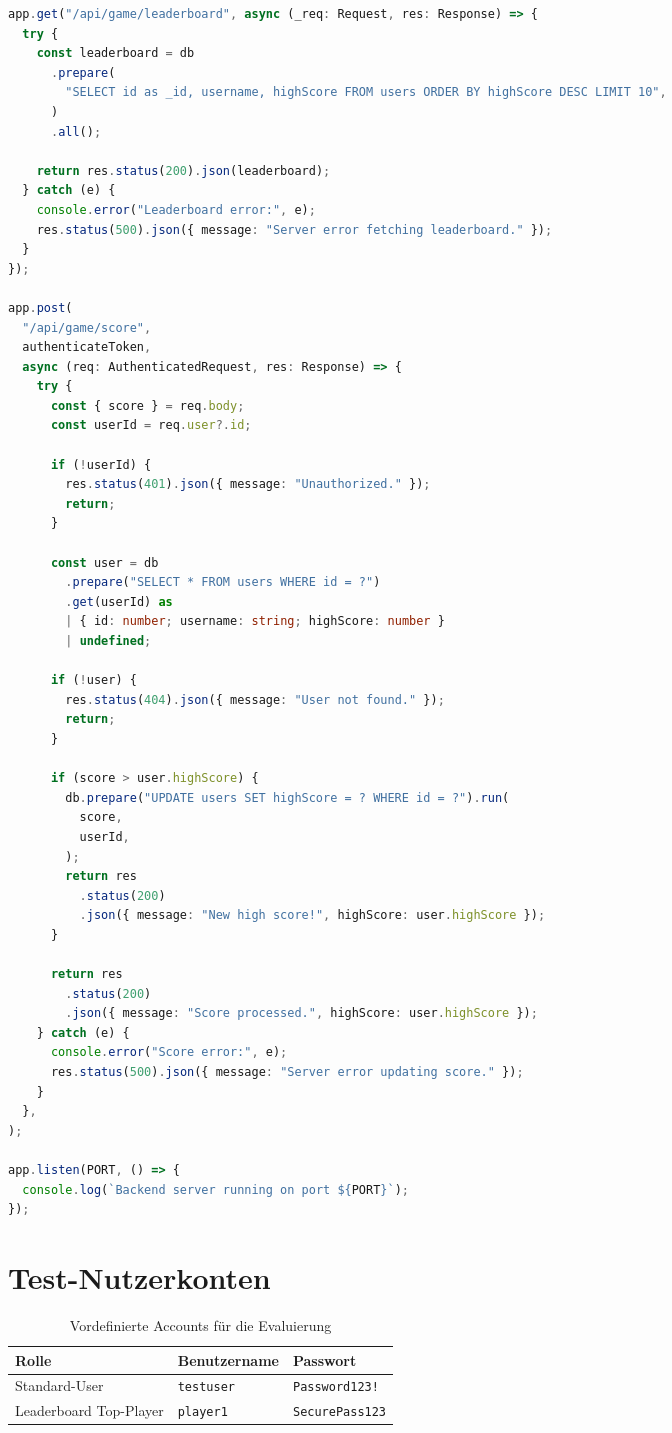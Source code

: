 \documentclass[12pt,a4paper]{article}
\begin{document}
\begin{lstlisting}[language=TypeScript, caption={Auszug aus server.ts}]
app.get("/api/game/leaderboard", async (_req: Request, res: Response) => {
  try {
    const leaderboard = db
      .prepare(
        "SELECT id as _id, username, highScore FROM users ORDER BY highScore DESC LIMIT 10",
      )
      .all();

    return res.status(200).json(leaderboard);
  } catch (e) {
    console.error("Leaderboard error:", e);
    res.status(500).json({ message: "Server error fetching leaderboard." });
  }
});

app.post(
  "/api/game/score",
  authenticateToken,
  async (req: AuthenticatedRequest, res: Response) => {
    try {
      const { score } = req.body;
      const userId = req.user?.id;

      if (!userId) {
        res.status(401).json({ message: "Unauthorized." });
        return;
      }

      const user = db
        .prepare("SELECT * FROM users WHERE id = ?")
        .get(userId) as
        | { id: number; username: string; highScore: number }
        | undefined;

      if (!user) {
        res.status(404).json({ message: "User not found." });
        return;
      }

      if (score > user.highScore) {
        db.prepare("UPDATE users SET highScore = ? WHERE id = ?").run(
          score,
          userId,
        );
        return res
          .status(200)
          .json({ message: "New high score!", highScore: user.highScore });
      }

      return res
        .status(200)
        .json({ message: "Score processed.", highScore: user.highScore });
    } catch (e) {
      console.error("Score error:", e);
      res.status(500).json({ message: "Server error updating score." });
    }
  },
);

app.listen(PORT, () => {
  console.log(`Backend server running on port ${PORT}`);
});
\end{lstlisting}

\section{Test-Nutzerkonten}
\begin{table}[htbp]
  \centering
  \caption{Vordefinierte Accounts für die Evaluierung}
  \begin{tabular}{lll}
    \toprule
    \textbf{Rolle} & \textbf{Benutzername} & \textbf{Passwort} \\ \midrule
    Standard-User & \texttt{testuser} & \texttt{Password123!} \\
    Leaderboard Top-Player & \texttt{player1} & \texttt{SecurePass123} \\ \bottomrule
  \end{tabular}
\end{table}
\end{document}
